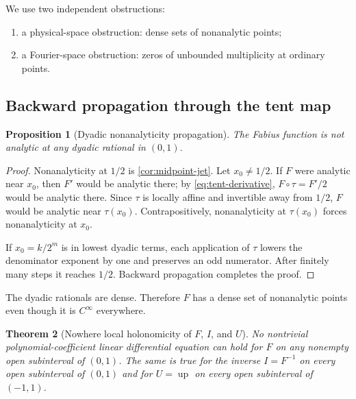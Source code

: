 \documentclass[11pt,oneside]{article}
\newtheorem{theorem}{Theorem}[section]
\newtheorem{proposition}[theorem]{Proposition}
\theoremstyle{definition}
\theoremstyle{remark}
\newcommand{\Up}{\operatorname{up}}
\begin{document}
We use two independent obstructions:
\begin{enumerate}
\item a physical-space obstruction: dense sets of nonanalytic points;
\item a Fourier-space obstruction: zeros of unbounded multiplicity at ordinary points.
\end{enumerate}

\subsection{Backward propagation through the tent map}
\begin{proposition}[Dyadic nonanalyticity propagation]
\label{prop:dyadic-nonanalyticity}
The Fabius function is not analytic at any dyadic rational in $(0,1)$.
\end{proposition}

\begin{proof}
Nonanalyticity at $1/2$ is \cref{cor:midpoint-jet}.  Let $x_0\ne1/2$.  If $F$ were analytic near $x_0$, then $F'$ would be analytic there; by \eqref{eq:tent-derivative}, $F\circ\tau=F'/2$ would be analytic there.  Since $\tau$ is locally affine and invertible away from $1/2$, $F$ would be analytic near $\tau(x_0)$.  Contrapositively, nonanalyticity at $\tau(x_0)$ forces nonanalyticity at $x_0$.

If $x_0=k/2^m$ is in lowest dyadic terms, each application of $\tau$ lowers the denominator exponent by one and preserves an odd numerator.  After finitely many steps it reaches $1/2$.  Backward propagation completes the proof.
\end{proof}

The dyadic rationals are dense.  Therefore $F$ has a dense set of nonanalytic points even though it is $C^\infty$ everywhere.

\begin{theorem}[Nowhere local holonomicity of $F$, $I$, and $U$]
\label{thm:physical-nondfinite}
No nontrivial polynomial-coefficient linear differential equation can hold for $F$ on any nonempty open subinterval of $(0,1)$.  The same is true for the inverse $I=F^{-1}$ on every open subinterval of $(0,1)$ and for $U=\Up$ on every open subinterval of $(-1,1)$.
\end{theorem}
\end{document}
